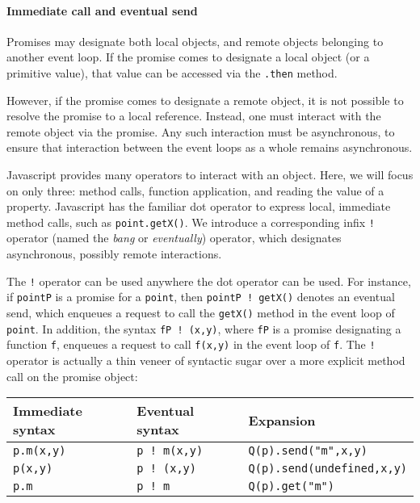 \documentclass{llncs}
\begin{document}
\paragraph{Immediate call and eventual send}

Promises may designate both local objects, and remote objects belonging to another event loop. If the promise comes to designate a local object (or a primitive value), that value can be accessed via the \texttt{.then} method.

However, if the promise comes to designate a remote object, it is not possible to resolve the promise to a local reference. Instead, one must interact with the remote object via the promise. Any such interaction must be asynchronous, to ensure that interaction between the event loops as a whole remains asynchronous.

Javascript provides many operators to interact with an object. Here, we will focus on only three: method calls, function application, and reading the value of a property. Javascript has the familiar dot operator to express local, immediate method calls, such as \texttt{point.getX()}. We introduce a corresponding infix \texttt{!} operator (named the \emph{bang} or \emph{eventually}) operator, which designates asynchronous, possibly remote interactions.

The \texttt{!} operator can be used anywhere the dot operator can be used. For instance, if \texttt{pointP} is a promise for a \texttt{point}, then \texttt{pointP ! getX()} denotes an eventual send, which enqueues a request to call the \texttt{getX()} method in the event loop of \texttt{point}. In addition, the syntax \texttt{fP ! (x,y)}, where \texttt{fP} is a promise designating a function \texttt{f}, enqueues a request to call \texttt{f(x,y)} in the event loop of \texttt{f}. The \texttt{!} operator is actually a thin veneer of syntactic sugar over a more explicit method call on the promise object:


\begin{center}
  \begin{tabular}{|l|l|l|}
  \hline
  Immediate syntax & Eventual syntax & Expansion \\
  \hline
  \texttt{p.m(x,y)} & \texttt{p ! m(x,y)} & \texttt{Q(p).send("m",x,y)} \\
  \texttt{p(x,y)} & \texttt{p ! (x,y)} & \texttt{Q(p).send(undefined,x,y)}\\
  \texttt{p.m} & \texttt{p ! m} & \texttt{Q(p).get("m")}\\
  \hline
  \end{tabular} 
\end{center}
\end{document}
